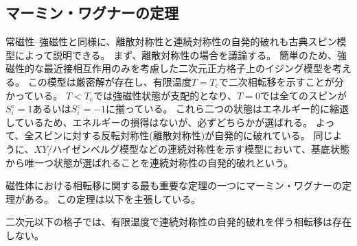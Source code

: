 \documentclass[12pt,titlepage,dvipdfmx]{jarticle}
\begin{document}
%
%
%
\subsection{マーミン・ワグナーの定理}
常磁性--強磁性と同様に、離散対称性と連続対称性の自発的破れも古典スピン模型によって説明できる。
まず、離散対称性の場合を議論する。
簡単のため、強磁性的な最近接相互作用のみを考慮した二次元正方格子上のイジング模型を考える。
この模型は厳密解が存在し、有限温度$T=T_{\mathrm{c}}$で二次相転移を示すことが分かっている。
$T<T_{\mathrm{c}}$では強磁性状態が支配的となり、$T=0$では全てのスピンが$S_i^z=1$あるいは$S_i^z=-1$に揃っている。
これら二つの状態はエネルギー的に縮退しているため、エネルギーの損得はないが、必ずどちらかが選ばれる。
よって、全スピンに対する反転対称性(離散対称性)が自発的に破れている。
同じように、$XY$/ハイゼンベルグ模型などの連続対称性を示す模型において、基底状態から唯一つ状態が選ばれることを連続対称性の自発的破れという。

磁性体における相転移に関する最も重要な定理の一つにマーミン・ワグナーの定理\cite{Mermin1966}がある。
この定理は以下を主張している。
\begin{center}
   二次元以下の格子では、有限温度で連続対称性の自発的破れを伴う相転移は存在しない。
\end{center}
\end{document}
